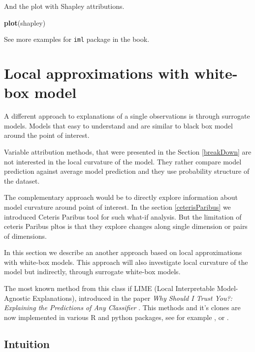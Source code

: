 \documentclass[12pt,]{krantz}
\newenvironment{Shaded}{\begin{snugshade}}{\end{snugshade}}
\newcommand{\KeywordTok}[1]{\textcolor[rgb]{0.13,0.29,0.53}{\textbf{#1}}}
\newcommand{\NormalTok}[1]{#1}
\theoremstyle{definition}
\theoremstyle{definition}
\theoremstyle{definition}
\theoremstyle{remark}
\begin{document}
And the plot with Shapley attributions.

\begin{Shaded}
\begin{Highlighting}[]
\KeywordTok{plot}\NormalTok{(shapley)}
\end{Highlighting}
\end{Shaded}

See more examples for \texttt{iml} package in the \citep{molnar} book.

\hypertarget{LIME}{%
\section{Local approximations with white-box model}\label{LIME}}

A different approach to explanations of a single observations is through
surrogate models. Models that easy to understand and are similar to
black box model around the point of interest.

Variable attribution methods, that were presented in the Section
\ref{breakDown} are not interested in the local curvature of the model.
They rather compare model prediction against average model prediction
and they use probability structure of the dataset.

The complementary approach would be to directly explore information
about model curvature around point of interest. In the section
\ref{ceterisParibus} we introduced Ceteris Paribus tool for such what-if
analysis. But the limitation of ceteris Paribus pltos is that they
explore changes along single dimension or pairs of dimensions.

In this section we describe an another approach based on local
approximations with white-box models. This approach will also
investigate local curvature of the model but indirectly, through
surrogate white-box models.

The most known method from this class if LIME (Local Interpretable
Model-Agnostic Explanations), introduced in the paper \emph{Why Should I
Trust You?: Explaining the Predictions of Any Classifier} \citep{lime}.
This methods and it's clones are now implemented in various R and python
packages, see for example \citep{R-lime}, \citep{R-live} or
\citep{R-iml}.

\hypertarget{intuition-8}{%
\subsection{Intuition}\label{intuition-8}}
\end{document}
